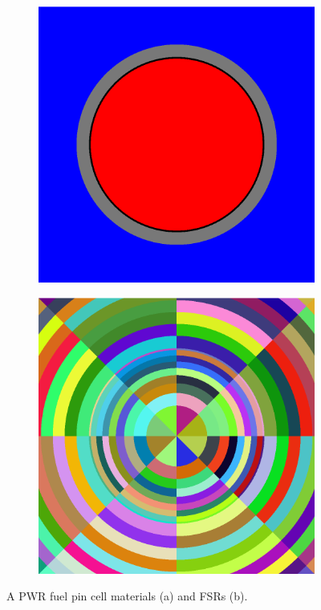 \begin{figure}[h!]
\centering
\begin{subfigure}{.25\textwidth}
  \includegraphics[width=0.9\linewidth]{figures/pin-cell-simple}
  \caption{}
  \label{fig:pin-materials}
\end{subfigure}%
\begin{subfigure}{.25\textwidth}
  \centering
  \includegraphics[width=0.9\linewidth]{figures/pin-cell-8x8}
  \caption{}
  \label{fig:pin-fsrs}
\end{subfigure}
\caption{A PWR fuel pin cell materials (a) and FSRs (b).}
\label{fig:pin-cell}
\end{figure}


